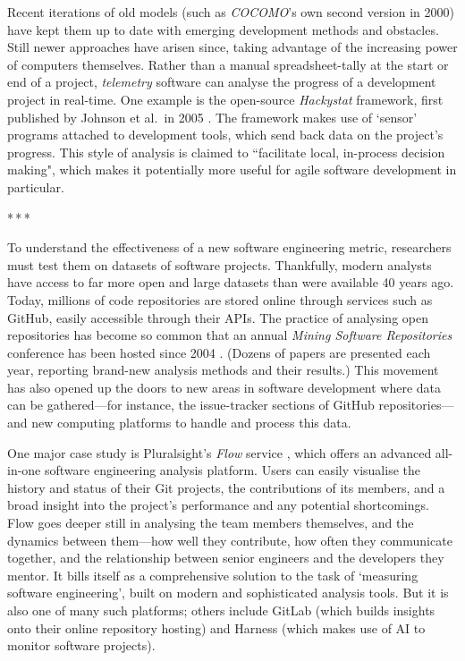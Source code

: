 \documentclass[12pt]{article}
\newcommand{\parbreak}{\bigskip\par\centerline{*\,*\,*}\medskip\par}
\begin{document}
	Recent iterations of old models (such as \textit{COCOMO}'s own second version in 2000) have kept them up to date with emerging development methods and obstacles. Still newer approaches have arisen since, taking advantage of the increasing power of computers themselves. Rather than a manual spreadsheet-tally at the start or end of a project, \textit{telemetry} software can analyse the progress of a development project in real-time. One example is the open-source \textit{Hackystat} framework, first published by Johnson et al.\ in 2005 \cite{telemetry}. The framework makes use of `sensor' programs attached to development tools, which send back data on the project's progress. This style of analysis is claimed to ``facilitate local, in-process decision making", which makes it potentially more useful for agile software development in particular.
	
	\parbreak
	
	To understand the effectiveness of a new software engineering metric, researchers must test them on datasets of software projects. Thankfully, modern analysts have access to far more open and large datasets than were available 40 years ago. Today, millions of code repositories are stored online through services such as GitHub, easily accessible through their APIs. The practice of analysing open repositories has become so common that an annual \textit{Mining Software Repositories} conference has been hosted since 2004 \cite{msr}. (Dozens of papers are presented each year, reporting brand-new analysis methods and their results.) This movement has also opened up the doors to new areas in software development where data can be gathered---for instance, the issue-tracker sections of GitHub repositories---and new computing platforms to handle and process this data.
	
	One major case study is Pluralsight's \textit{Flow} service \cite{flow}, which offers an advanced all-in-one software engineering analysis platform. Users can easily visualise the history and status of their Git projects, the contributions of its members, and a broad insight into the project's performance and any potential shortcomings. Flow goes deeper still in analysing the team members themselves, and the dynamics between them---how well they contribute, how often they communicate together, and the relationship between senior engineers and the developers they mentor. It bills itself as a comprehensive solution to the task of `measuring software engineering', built on modern and sophisticated analysis tools. But it is also one of many such platforms; others include GitLab (which builds insights onto their online repository hosting) and Harness (which makes use of AI to monitor software projects).
	
\end{document}

